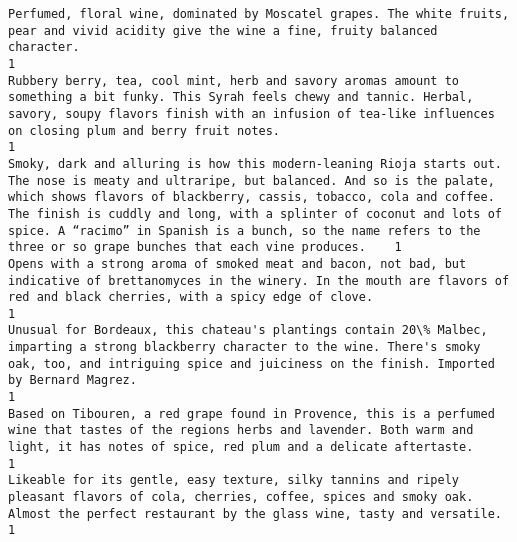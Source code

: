 \documentclass[11pt]{article}
\begin{document}
\begin{Verbatim}[commandchars=\\\{\}]
Perfumed, floral wine, dominated by Moscatel grapes. The white fruits, pear and vivid acidity give the wine a fine, fruity balanced character.                                                                                                                                                                                                                                                                 1
Rubbery berry, tea, cool mint, herb and savory aromas amount to something a bit funky. This Syrah feels chewy and tannic. Herbal, savory, soupy flavors finish with an infusion of tea-like influences on closing plum and berry fruit notes.                                                                                                                                                                  1
Smoky, dark and alluring is how this modern-leaning Rioja starts out. The nose is meaty and ultraripe, but balanced. And so is the palate, which shows flavors of blackberry, cassis, tobacco, cola and coffee. The finish is cuddly and long, with a splinter of coconut and lots of spice. A “racimo” in Spanish is a bunch, so the name refers to the three or so grape bunches that each vine produces.    1
Opens with a strong aroma of smoked meat and bacon, not bad, but indicative of brettanomyces in the winery. In the mouth are flavors of red and black cherries, with a spicy edge of clove.                                                                                                                                                                                                                    1
Unusual for Bordeaux, this chateau's plantings contain 20\% Malbec, imparting a strong blackberry character to the wine. There's smoky oak, too, and intriguing spice and juiciness on the finish. Imported by Bernard Magrez.                                                                                                                                                                                  1
Based on Tibouren, a red grape found in Provence, this is a perfumed wine that tastes of the regions herbs and lavender. Both warm and light, it has notes of spice, red plum and a delicate aftertaste.                                                                                                                                                                                                       1
Likeable for its gentle, easy texture, silky tannins and ripely pleasant flavors of cola, cherries, coffee, spices and smoky oak. Almost the perfect restaurant by the glass wine, tasty and versatile.                                                                                                                                                                                                        1

\end{Verbatim}
\end{document}
